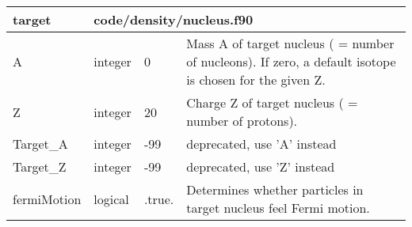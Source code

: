 \documentclass{article}
\begin{document}

\begin{longtable}{llll}
\toprule
\textbf{\large{target}} & \multicolumn{3}{l}{\footnotesize{code/density/nucleus.f90}}\\*
\midrule
\endfirsthead
\midrule
\endhead
A & \begin{minipage}[t]{2cm}integer\end{minipage} & \begin{minipage}[t]{2cm}0\end{minipage} & \begin{minipage}[t]{12cm}Mass A of target nucleus ( = number of nucleons). If zero, a default isotope is chosen for the given Z.\end{minipage}\\*
\midrule
Z & \begin{minipage}[t]{2cm}integer\end{minipage} & \begin{minipage}[t]{2cm}20\end{minipage} & \begin{minipage}[t]{12cm}Charge Z of target nucleus ( = number of protons).\end{minipage}\\*
\midrule
Target\_A & \begin{minipage}[t]{2cm}integer\end{minipage} & \begin{minipage}[t]{2cm}-99\end{minipage} & \begin{minipage}[t]{12cm}deprecated, use 'A' instead\end{minipage}\\*
\midrule
Target\_Z & \begin{minipage}[t]{2cm}integer\end{minipage} & \begin{minipage}[t]{2cm}-99\end{minipage} & \begin{minipage}[t]{12cm}deprecated, use 'Z' instead\end{minipage}\\*
\midrule
fermiMotion & \begin{minipage}[t]{2cm}logical\end{minipage} & \begin{minipage}[t]{2cm}.true.\end{minipage} & \begin{minipage}[t]{12cm}Determines whether particles in target nucleus feel Fermi motion.\end{minipage}\\*

\end{longtable}
\end{document}
